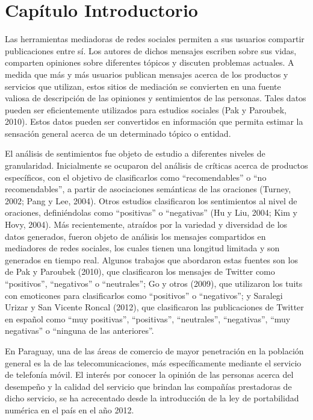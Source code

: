 \chapter {Cap\'itulo Introductorio}\label{Introduccion}

Las herramientas mediadoras de redes sociales permiten a sus usuarios compartir publicaciones entre s\'i. Los autores de dichos mensajes escriben sobre sus vidas, comparten opiniones sobre diferentes t\'opicos y discuten problemas actuales. A medida que m\'as y m\'as usuarios publican mensajes acerca de los productos y servicios que utilizan, estos sitios de mediaci\'on se convierten en una fuente valiosa de descripci\'on de las opiniones y sentimientos de las personas. Tales datos pueden ser eficientemente utilizados para estudios sociales (Pak y Paroubek, 2010). Estos datos pueden ser convertidos en informaci\'on que permita estimar la sensaci\'on general acerca de un determinado t\'opico o entidad.
\newline

El an\'alisis de sentimientos fue objeto de estudio a diferentes niveles de granularidad. Inicialmente se ocuparon del an\'alisis de cr\'iticas acerca de productos espec\'ificos, con el objetivo de clasificarlos como ``recomendables'' o ``no recomendables'', a partir de asociaciones sem\'anticas de las oraciones (Turney, 2002; Pang y Lee, 2004). Otros estudios clasificaron los sentimientos al nivel de oraciones, defini\'endolas como ``positivas'' o ``negativas'' (Hu y Liu, 2004; Kim y Hovy, 2004). M\'as recientemente, atra\'idos por la variedad y diversidad de los datos generados, fueron objeto de an\'alisis los mensajes compartidos en mediadores de redes sociales, los cuales tienen una longitud limitada y son generados en tiempo real. Algunos trabajos que abordaron estas fuentes son los de Pak y Paroubek (2010), que clasificaron los mensajes de Twitter como ``positivos'', ``negativos'' o ``neutrales''; Go y otros (2009), que utilizaron los tuits con emoticones para clasificarlos como ``positivos'' o ``negativos''; y Saralegi Urizar y San Vicente Roncal (2012), que clasificaron las publicaciones de Twitter en espa\~nol como ``muy positivas'', ``positivas'', ``neutrales'', ``negativas'', ``muy negativas'' o ``ninguna de las anteriores''.
\newline

En Paraguay, una de las \'areas de comercio de mayor penetraci\'on en la poblaci\'on general es la de las telecomunicaciones, m\'as espec\'ificamente mediante el servicio de telefon\'ia m\'ovil. El inter\'es por conocer la opini\'on de las personas acerca del desempe\~no y la calidad del servicio que brindan las compa\~n\'ias prestadoras de dicho servicio, se ha acrecentado desde la introducci\'on de la ley de portabilidad num\'erica en el pa\'is en el a\~no 2012. 
\newline

